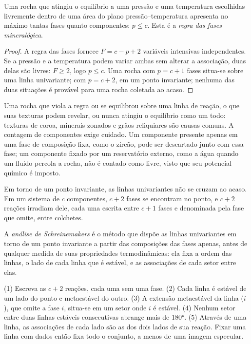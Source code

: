 \begin{proposition}\label{prop:b3:petrological-thermodynamics:goldschmidt}
Uma rocha que atingiu o equilíbrio a uma pressão e uma temperatura escolhidas
livremente dentro de uma área do plano pressão--temperatura apresenta no máximo tantas
fases quanto componentes: $p \le c$. Esta é a
\emph{regra das fases mineralógica}.
\end{proposition}

\begin{proof}
A regra das fases fornece $F = c - p + 2$ variáveis intensivas independentes. Se a
pressão e a temperatura podem variar ambas sem alterar a associação, duas delas são
livres: $F \ge 2$, logo $p \le c$. Uma rocha com $p = c + 1$ fases situa-se sobre uma
linha univariante; com $p = c + 2$, em um ponto invariante; nenhuma das duas situações é
provável para uma rocha coletada ao acaso.
\end{proof}

Uma rocha que viola a regra ou se equilibrou sobre uma linha de reação, o que suas texturas
podem revelar, ou nunca atingiu o equilíbrio como um todo: texturas de coroa,
minerais zonados e grãos reliquiares são causas comuns. A contagem de componentes
exige cuidado. Um componente presente apenas em uma fase de composição fixa, como
o zircão, pode ser descartado junto com essa fase; um componente fixado por um
reservatório externo, como a água quando um fluido percola a rocha, não é contado
como livre, visto que seu potencial químico é imposto.

Em torno de um ponto invariante, as linhas univariantes não se cruzam ao acaso. Em um
sistema de $c$ componentes, $c + 2$ fases se encontram no ponto, e $c + 2$
reações irradiam dele, cada uma escrita entre $c + 1$ fases e denominada pela
fase que omite, entre colchetes.

\begin{definition}\label{def:b3:petrological-thermodynamics:schreinemakers}
A \emph{análise de Schreinemakers} é o método
que dispõe as linhas univariantes em torno de um ponto invariante a partir das
composições das fases apenas, antes de qualquer medida de suas propriedades
termodinâmicas: ela fixa a ordem das linhas, o lado de cada linha
que é estável, e as associações de cada setor entre elas.
\end{definition}

\begin{method}\label{met:b3:petrological-thermodynamics:schreinemakers}
(1) Escreva as $c + 2$ reações, cada uma sem uma fase. (2) Cada linha é
estável de um lado do ponto e metaestável do outro. (3) A
extensão metaestável da linha ($i$), que omite a fase $i$, situa-se em um
setor onde $i$ é estável. (4) Nenhum setor entre duas linhas estáveis consecutivas
abrange mais de \ang{180}. (5) Através de uma linha, as associações de cada lado
são as dos dois lados de sua reação. Fixar uma linha com dados então
fixa todo o conjunto, a menos de uma imagem especular.
\end{method}

